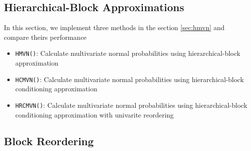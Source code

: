 \subsection{Hierarchical-Block Approximations}

In this section, we implement three methods in the section \ref{sec:hmvn} and compare theirs performance
\begin{itemize}
    \item \texttt{HMVN()}: Calculate multivariate normal probabilities using hierarchical-block approximation
    \item \texttt{HCMVN()}: Calculate multivariate normal probabilities using hierarchical-block conditioning approximation
    \item \texttt{HRCMVN()}: Calculate multivariate normal probabilities using hierarchical-block conditioning approximation with univarite reordering
\end{itemize}

\subsection{Block Reordering}
